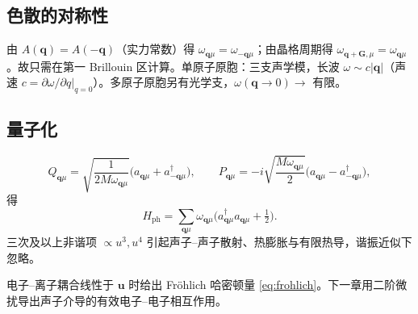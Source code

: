 \subsection{色散的对称性}

由 $A(\mathbf{q})=A(-\mathbf{q})$（实力常数）得 $\omega_{\mathbf{q}\mu}=\omega_{-\mathbf{q}\mu}$；由晶格周期得 $\omega_{\mathbf{q}+\mathbf{G},\mu}=\omega_{\mathbf{q}\mu}$。故只需在第一 Brillouin 区计算。单原子原胞：三支声学模，长波 $\omega\sim c|\mathbf{q}|$（声速 $c=\partial\omega/\partial q|_{q=0}$）。多原子原胞另有光学支，$\omega(\mathbf{q}\to0)\to$ 有限。

\subsection{量子化}

\begin{equation}
  Q_{\mathbf{q}\mu}
  =\sqrt{\frac{1}{2M\omega_{\mathbf{q}\mu}}}
  \bigl(a_{\mathbf{q}\mu}+a_{-\mathbf{q}\mu}^\dagger\bigr),
  \qquad
  P_{\mathbf{q}\mu}
  =-i\sqrt{\frac{M\omega_{\mathbf{q}\mu}}{2}}
  \bigl(a_{\mathbf{q}\mu}-a_{-\mathbf{q}\mu}^\dagger\bigr),
\end{equation}
得
\begin{equation}
  H_{\mathrm{ph}}
  =\sum_{\mathbf{q}\mu}
  \omega_{\mathbf{q}\mu}
  \bigl(a_{\mathbf{q}\mu}^\dagger a_{\mathbf{q}\mu}+\tfrac12\bigr).
\end{equation}
三次及以上非谐项 $\propto u^3,u^4$ 引起声子--声子散射、热膨胀与有限热导，谐振近似下忽略。

\begin{note}
电子--离子耦合线性于 $\mathbf{u}$ 时给出 Fr\"ohlich 哈密顿量 \eqref{eq:frohlich}。下一章用二阶微扰导出声子介导的有效电子--电子相互作用。
\end{note}
